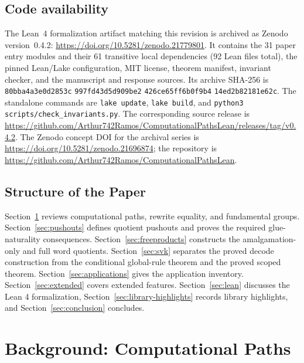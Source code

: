 \documentclass{lmcs}
\theoremstyle{definition}
\theoremstyle{plain}
\theoremstyle{remark}
\begin{document}
\subsection{Code availability}

The Lean~4 formalization artifact matching this revision is archived as
Zenodo version~0.4.2:
\url{https://doi.org/10.5281/zenodo.21779801}.
It contains the 31 paper entry modules and their 61 transitive local
dependencies (92 Lean files total), the pinned Lean/Lake configuration, MIT
license, theorem manifest, invariant checker, and the manuscript and response
sources.  Its archive SHA-256 is
\texttt{80bba4a3e0d2853c}\allowbreak
\texttt{997fd43d5d909be2}\allowbreak
\texttt{426ce65ff6b0f9b4}\allowbreak
\texttt{14ed2b82181e62c}.
The standalone commands are
\texttt{lake update},
\texttt{lake build}, and \texttt{python3 scripts/check\_invariants.py}.
The corresponding source release is
\url{https://github.com/Arthur742Ramos/ComputationalPathsLean/releases/tag/v0.4.2}.
The Zenodo concept DOI for the archival series is
\url{https://doi.org/10.5281/zenodo.21696874}; the repository is
\url{https://github.com/Arthur742Ramos/ComputationalPathsLean}.

\subsection{Structure of the Paper}

Section~\ref{sec:background} reviews computational paths, rewrite equality, and
fundamental groups. Section~\ref{sec:pushouts} defines quotient pushouts and
proves the required glue-naturality consequences. Section~\ref{sec:freeproducts}
constructs the amalgamation-only and full word quotients.
Section~\ref{sec:svk} separates the proved decode construction from the
conditional global-rule theorem and the proved scoped theorem.
Section~\ref{sec:applications} gives the application inventory.
Section~\ref{sec:extended} covers extended
features. Section~\ref{sec:lean} discusses the Lean 4 formalization,
Section~\ref{sec:library-highlights} records library highlights, and
Section~\ref{sec:conclusion} concludes.

\section{Background: Computational Paths}
\label{sec:background}
\end{document}

